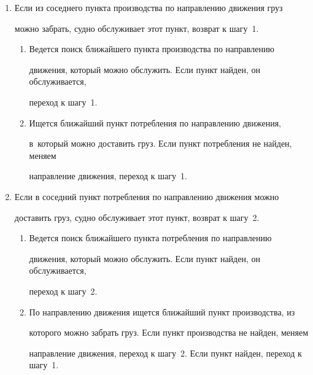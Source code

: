   \begin{enumerate}[1.]


  \item  Если из соседнего пункта производства по направлению движения груз 


можно забрать, судно обслуживает этот пункт, возврат к шагу~1.


  \begin{enumerate}[{1}.1]


  \item Ведется поиск ближайшего пункта производства по направлению 


движения, который можно обслужить. Если пункт найден, он обслуживается, 


переход к шагу~1.\\[-14pt]


  \item Ищется ближайший пункт потребления по направлению движения, 


  в~который можно доставить груз. Если пункт потребления не найден, меняем 


направление движения, переход к шагу~1.\\[-14pt]


  \end{enumerate}


  \item Если в соседний пункт потребления по направлению движения можно 


доставить груз, судно обслуживает этот пункт, возврат к шагу~2.\\[-14pt]


  \begin{enumerate}[2.1]


  \item Ведется поиск ближайшего пункта потребления по направлению 


движения, который можно обслужить. Если пункт найден, он обслуживается, 


переход к шагу~2.\\[-14pt]


  \item По направлению движения ищется ближайший пункт производства, из 


которого можно забрать груз. Если пункт производства не найден, меняем 


направление движения, переход к шагу~2. Если пункт найден, переход к шагу~1.\\[-14pt]


  \end{enumerate}


  \end{enumerate}


